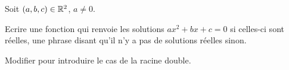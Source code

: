 Soit $(a,b,c) \in \mathbb{R}^2$, $a\not=0$. 

Ecrire une fonction  qui renvoie les solutions $ax^2+bx+c=0$ si celles-ci sont réelles, 
une phrase disant qu'il n'y a pas de solutions réelles sinon. 

Modifier pour introduire le cas de la racine double.
